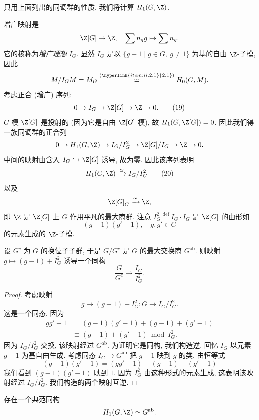 只用上面列出的同调群的性质, 我们将计算 $H_1(G,\Z)$.

增广映射是
\[
 \Z[G]\to\Z,\quad \sum n_g g\mapsto \sum n_g.
\]
它的核称为\emph{增广理想} $I_G$. 显然 $I_G$ 是以 $\{g-1\mid g\in G,\ g\neq 1\}$ 为基的自由 $\Z$-子模, 因此
\[
 M/I_G M=M_G\stackrel{(\hyperlink{item:ii.2.1}{2.1})}{\simeq} H_0(G,M).
\]
考虑正合 (增广) 序列:
\begin{equation*}
 0\to I_G\to \Z[G]\to\Z\to 0.
\tag{19}
\end{equation*}
$G$-模 $\Z[G]$ 是投射的 (因为它是自由 $\Z[G]$-模), 故 $H_1(G,\Z[G])=0$. 因此我们得一族同调群的正合列
\[
 0\to H_1(G,\Z)\to I_G/I_G^2\to \Z[G]/I_G\to\Z\to 0.
\]
中间的映射由含入 $I_G\hookrightarrow \Z[G]$ 诱导, 故为零. 因此该序列表明
\begin{equation*}
 H_1(G,\Z)\xrightarrow{\simeq} I_G/I_G^2
\tag{20}
\end{equation*}
以及
\[
 \Z[G]_G\xrightarrow{\simeq}\Z,
\]
即 $\Z$ 是 $\Z[G]$ 上 $G$ 作用平凡的最大商群. 注意 $I_G^2\stackrel{\mathrm{def}}{=}I_G\cdot I_G$ 是 $\Z[G]$ 的由形如
\[
 (g-1)(g'-1),\quad g,g'\in G
\]
的元素生成的 $\Z$-子模.

\begin{lemma}\label{lem:ii.2.6}
设 $G^c$ 为 $G$ 的换位子子群, 于是 $G/G^c$ 是 $G$ 的最大交换商 $G^{\mathrm{ab}}$. 则映射 $g\mapsto (g-1)+I_G^2$ 诱导一个同构
\begin{equation*}
 \frac{G}{G^c}\to \frac{I_G}{I_G^2}.
\tag{21}
\end{equation*}
\end{lemma}

\begin{proof}
考虑映射
\[
 g\mapsto (g-1)+I_G^2\colon G\to I_G/I_G^2.
\]
这是一个同态, 因为
\[
 \begin{aligned}
 gg'-1&=(g-1)(g'-1)+(g-1)+(g'-1)\\
 &\equiv (g-1)+(g'-1)\bmod I_G^2.
 \end{aligned}
\]
因为 $I_G/I_G^2$ 交换, 该映射经过 $G^{\mathrm{ab}}$. 为证明它是同构, 我们构造逆. 回忆 $I_G$ 以元素 $g-1$ 为基自由生成. 考虑同态 $I_G\to G^{\mathrm{ab}}$ 把 $g-1$ 映到 $g$ 的类. 由恒等式
\[
 (g-1)(g'-1)=(gg'-1)-(g-1)-(g'-1)
\]
我们看到 $(g-1)(g'-1)$ 映到 $1$. 因为 $I_G^2$ 由这种形式的元素生成, 这表明该映射经过 $I_G/I_G^2$. 我们构造的两个映射互逆.
\end{proof}

\begin{proposition}\label{prop:ii.2.7}
存在一个典范同构
\[
 H_1(G,\Z)\simeq G^{\mathrm{ab}}.
\]
\end{proposition}

